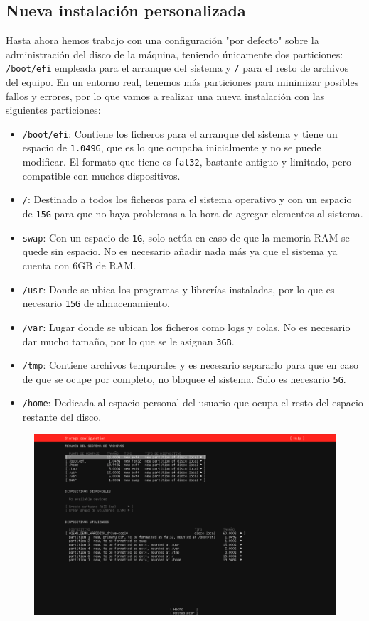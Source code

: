 \documentclass[10pt]{article}
\begin{document}
	\subsection{Nueva instalación personalizada}
	Hasta ahora hemos trabajo con una configuración "por defecto" sobre la administración del disco de la máquina, teniendo únicamente dos particiones: \verb|/boot/efi| empleada para el arranque del sistema y \verb|/| para el resto de archivos del equipo. En un entorno real, tenemos más particiones para minimizar posibles fallos y errores, por lo que vamos a realizar una nueva instalación con las siguientes particiones:
	\begin{itemize}
		\item \verb|/boot/efi|: Contiene los ficheros para el arranque del sistema y tiene un espacio de \verb|1.049G|, que es lo que ocupaba inicialmente y no se puede modificar. El formato que tiene es \verb|fat32|, bastante antiguo y limitado, pero compatible con muchos dispositivos.
		\item \verb|/|: Destinado a todos los ficheros para el sistema operativo y con un espacio de \verb|15G| para que no haya problemas a la hora de agregar elementos al sistema.
		\item \verb|swap|: Con un espacio de \verb|1G|, solo actúa en caso de que la memoria RAM se quede sin espacio. No es necesario añadir nada más ya que el sistema ya cuenta con 6GB de RAM.
		\item \verb|/usr|: Donde se ubica los programas y librerías instaladas, por lo que es necesario \verb|15G| de almacenamiento.
		\item \verb|/var|: Lugar donde se ubican los ficheros como logs y colas. No es necesario dar mucho tamaño, por lo que se le asignan \verb|3GB|.
		\item \verb|/tmp|: Contiene archivos temporales y es necesario separarlo para que en caso de que se ocupe por completo, no bloquee el sistema. Solo es necesario \verb|5G|.
		\item \verb|/home|: Dedicada al espacio personal del usuario que ocupa el resto del espacio restante del disco.
	\end{itemize}
	\begin{figure}[H]
		\setlength{\abovecaptionskip}{0cm}
		\setlength{\belowcaptionskip}{0cm}
		\centering
		\includegraphics[width=0.6\linewidth]{Recursos/nuevaInstalacion.png}
	\end{figure}
	
\end{document}
